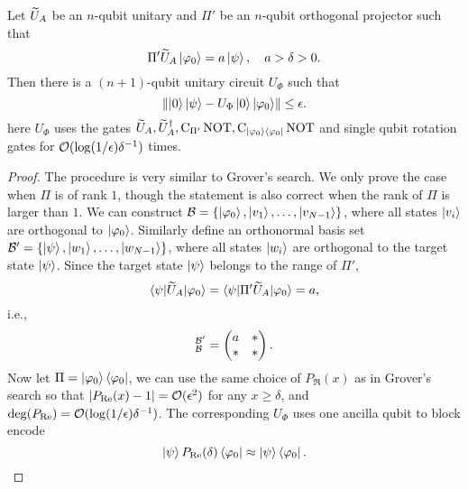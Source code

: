 \begin{prop}
Let $\widetilde{U}_A$ be an $n$-qubit unitary and $\Pi'$ be an $n$-qubit orthogonal projector such that 
\begin{equation}
\Pi' \widetilde{U}_A\ket{\varphi_0}=a\ket{\psi}, \quad a> \delta>0.
\end{equation}
Then there is a $(n+1)$-qubit unitary circuit $U_{\Phi}$ such that
\begin{equation}
\left\lVert\ket{0}\ket{\psi}-U_{\Phi}\ket{0}\ket{\varphi_0}\right\rVert\le \epsilon.
\end{equation}
here $U_{\Phi}$ uses the gates $\widetilde{U}_A,\widetilde{U}_A^{\dag},\operatorname{C}_{\Pi'}\operatorname{NOT},\operatorname{C}_{\ket{\varphi_0}\bra{\varphi_0}}\operatorname{NOT}$ and single qubit rotation gates for $\mathcal{O}(\log(1/\epsilon) \delta^{-1})$ times.
\label{prop:fixedpt_aa}
\end{prop}
\begin{proof}
The procedure is very similar to Grover's search.
We only prove the case when $\Pi$ is of rank $1$, though the statement is also correct when the rank of $\Pi$ is larger than $1$.
We can construct $\mathcal{B}=\{\ket{\varphi_0},\ket{v_1},\ldots,\ket{v_{N-1}}\}$, where all states $\ket{v_i}$ are orthogonal to $\ket{\varphi_0}$. 
Similarly define an orthonormal basis set $\mathcal{B}'=\{\ket{\psi},\ket{w_1},\ldots,\ket{w_{N-1}}\}$, where all states $\ket{w_i}$ are orthogonal to the target state $\ket{\psi}$.
Since the target state $\ket{\psi}$ belongs to the range of $\Pi'$, 
\begin{equation}
\braket{\psi|\widetilde{U}_A|\varphi_0}=\braket{\psi|\Pi '\widetilde{U}_A|\varphi_0}=a,
\end{equation}
i.e.,
\begin{equation}
[\wt{U}_A]_{\mc{B}}^{\mc{B}'}=\begin{pmatrix}
a & *\\
* & *
\end{pmatrix}.
\end{equation}
 Now let $\Pi=\ket{\varphi_0}\bra{\varphi_0}$, we can use the same choice of $P_{\Re}(x)$ as in Grover's search so that $\left\lvert P_{\operatorname{Re}}(x)-1\right\rvert=\mathcal{O}(\epsilon^2)$ for any $x\ge \delta$, and $\deg(P_{\operatorname{Re}})=\mathcal{O}(\log(1/\epsilon) \delta^{-1})$.
The corresponding $U_{\Phi}$ uses one ancilla qubit to block encode
\begin{equation}
\ket{\psi} P_{\operatorname{Re}}(\delta)\bra{\varphi_0}\approx \ket{\psi} \bra{\varphi_0}.
\end{equation} 
 \end{proof}

